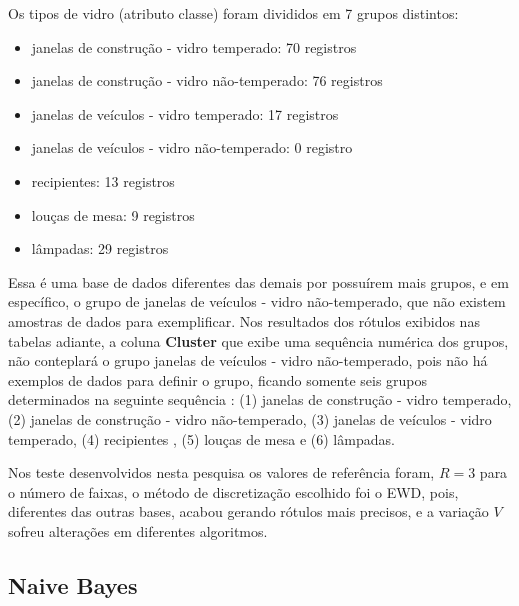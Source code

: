 Os tipos de vidro (atributo classe) foram divididos em 7 grupos distintos:
\begin{itemize} [noitemsep]
 \item janelas de construção - vidro temperado: 70 registros
 \item janelas de construção - vidro não-temperado: 76 registros
 \item janelas de veículos - vidro temperado: 17 registros
 \item janelas de veículos - vidro não-temperado: 0 registro
 \item recipientes: 13 registros
 \item louças de mesa: 9 registros
 \item lâmpadas: 29 registros 
\end{itemize}

Essa é uma base de dados diferentes das demais por possuírem mais grupos, e em específico, o grupo de janelas de veículos - vidro não-temperado, que não existem amostras de dados para exemplificar. Nos resultados dos rótulos exibidos nas tabelas adiante, a coluna \textbf{Cluster} que exibe uma sequência numérica dos grupos, não conteplará o grupo janelas de veículos - vidro não-temperado, pois não há exemplos de dados para definir o grupo,  ficando somente seis grupos determinados na seguinte sequência : (1) janelas de construção - vidro temperado, (2) janelas de construção - vidro não-temperado, (3) janelas de veículos - vidro temperado, (4) recipientes , (5) louças de mesa e (6) lâmpadas.

Nos teste desenvolvidos nesta pesquisa os valores de referência foram, ${R=3}$ para o número de faixas, o método de discretização escolhido foi o EWD, pois, diferentes das outras bases, acabou gerando rótulos mais precisos, e a variação  ${V}$ sofreu alterações em diferentes algoritmos.


\subsection{Naive Bayes} \label{cap:resultados:ssec:glass:nb}

